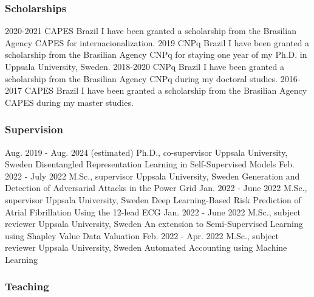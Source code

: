 \documentclass[10pt,letterpaper]{article} %
\begin{document}
\subsubsection*{Scholarships}


    { 2020-2021 }
    { CAPES }
    { Brazil }
    { I have been granted a scholarship from the Brasilian Agency CAPES for internacionalization. } 
    { 2019 }
    { CNPq }
    { Brazil }
    { I have been granted a scholarship from the Brasilian Agency CNPq for staying one year of my Ph.D. in Uppsala University, Sweden. } 
    { 2018-2020 }
    { CNPq }
    { Brazil }
    { I have been granted a scholarship from the Brasilian Agency CNPq during my doctoral studies. } 
    { 2016-2017 }
    { CAPES }
    { Brazil }
    { I have been granted a scholarship from the Brasilian Agency CAPES during my master studies. } 

\subsubsection*{Supervision}


        { Aug. 2019 - Aug. 2024 (estimated) }
        {  Ph.D., co-supervisor  }
        { Uppsala University, Sweden }
        { { Disentangled Representation Learning in Self-Supervised Models } }
        { Feb. 2022 - July 2022 }
        {  M.Sc., supervisor  }
        { Uppsala University, Sweden }
        { { Generation and Detection of Adversarial Attacks in the Power Grid } }
        { Jan. 2022 - June 2022 }
        {  M.Sc., supervisor  }
        { Uppsala University, Sweden }
        { { Deep Learning-Based Risk Prediction of Atrial Fibrillation Using the 12-lead ECG } }
        { Jan. 2022 - June 2022 }
        {  M.Sc., subject reviewer  }
        { Uppsala University, Sweden }
        { { An extension to Semi-Supervised Learning using Shapley Value Data Valuation } }
        { Feb. 2022 - Apr. 2022 }
        {  M.Sc., subject reviewer  }
        { Uppsala University, Sweden }
        { { Automated Accounting using Machine Learning } }


\subsubsection*{Teaching}
\end{document}
